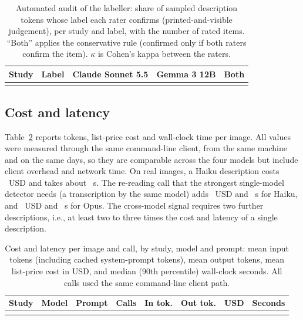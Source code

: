 \begin{table}[!tbp]
\caption{Automated audit of the labeller: share of sampled description tokens whose label each rater confirms (printed-and-visible judgement), per study and label, with the number of rated items. ``Both'' applies the conservative rule (confirmed only if both raters confirm the item). $\kappa$ is Cohen's kappa between the raters.}\label{tab:audit}
\footnotesize
\begin{tabular*}{\textwidth}{@{\extracolsep\fill}llrrr}
\toprule
Study & Label & Claude Sonnet 5.5 & Gemma 3 12B & Both \\
\midrule
\botrule
\end{tabular*}
\end{table}

\subsection{Cost and latency}\label{sec:cost}

Table~\ref{tab:cost} reports tokens, list-price cost and wall-clock time per image. All values were measured through the same command-line client, from the same machine and on the same days, so they are comparable across the four models but include client overhead and network time. On real images, a Haiku description costs \RealCostHaikuDesc{}~USD and takes about \RealCostHaikuDescSec{}~s. The re-reading call that the strongest single-model detector needs (a transcription by the same model) adds \RealCostHaikuTrans{}~USD and \RealCostHaikuTransSec{}~s for Haiku, and \RealCostOpusTrans{}~USD and \RealCostOpusTransSec{}~s for Opus. The cross-model signal requires two further descriptions, i.e., at least two to three times the cost and latency of a single description.

\begin{table}[!tbp]
\caption{Cost and latency per image and call, by study, model and prompt: mean input tokens (including cached system-prompt tokens), mean output tokens, mean list-price cost in USD, and median (90th percentile) wall-clock seconds. All calls used the same command-line client path.}\label{tab:cost}
\footnotesize
\setlength{\tabcolsep}{3pt}
\begin{tabular*}{\textwidth}{@{\extracolsep\fill}lllrrrrr}
\toprule
Study & Model & Prompt & Calls & In tok. & Out tok. & USD & Seconds \\
\midrule
\botrule
\end{tabular*}
\end{table}

